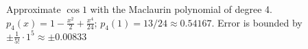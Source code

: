 {Approximate $\cos 1$ with the Maclaurin polynomial of degree 4.
}
{$p_4(x) =1-\frac{x^2}{2}+\frac{x^4}{24}$; $p_4(1) = 13/24\approx 0.54167$. Error is bounded by $\pm \frac{1}{5!}\cdot1^5 \approx \pm 0.00833$
}